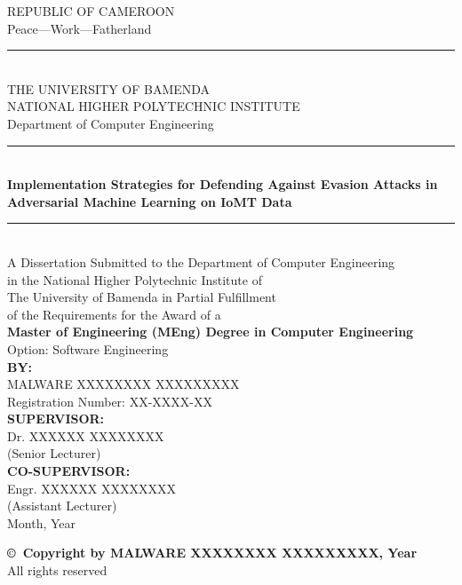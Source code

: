 \documentclass[12pt,a4paper,oneside]{report}
\begin{document}
\thispagestyle{empty}
\begin{center}
    \vspace*{0.5cm}
    {\large REPUBLIC OF CAMEROON}\\[0.2cm]
    {\large Peace---Work---Fatherland}\\[0.5cm]
    \rule{\textwidth}{0.5pt}\\[0.3cm]
    {\Large THE UNIVERSITY OF BAMENDA}\\[0.2cm]
    {\Large NATIONAL HIGHER POLYTECHNIC INSTITUTE}\\[0.2cm]
    {\large Department of Computer Engineering}\\[1.5cm]
    \rule{\textwidth}{0.5pt}\\[0.8cm]
    {\Huge\bfseries Implementation Strategies for Defending Against Evasion Attacks in Adversarial Machine Learning on IoMT Data}\\[1.0cm]
    \rule{\textwidth}{0.5pt}\\[1.0cm]
    {\large A Dissertation Submitted to the Department of Computer Engineering}\\
    {\large in the National Higher Polytechnic Institute of}\\
    {\large The University of Bamenda in Partial Fulfillment}\\
    {\large of the Requirements for the Award of a}\\[0.3cm]
    {\Large\bfseries Master of Engineering (MEng) Degree in Computer Engineering}\\[1.0cm]
    {\large Option: Software Engineering}\\[1.5cm]
    {\large\bfseries BY:}\\[0.3cm]
    {\Large MALWARE XXXXXXXX XXXXXXXXX}\\[0.2cm]
    {\large Registration Number: XX-XXXX-XX}\\[1.5cm]
    {\large\bfseries SUPERVISOR:}\\[0.3cm]
    {\large Dr. XXXXXX XXXXXXXX}\\[0.2cm]
    {\large (Senior Lecturer)}\\[0.5cm]
    {\large\bfseries CO-SUPERVISOR:}\\[0.3cm]
    {\large Engr. XXXXXX XXXXXXXX}\\[0.2cm]
    {\large (Assistant Lecturer)}\\[1.5cm]
    {\large Month, Year}
    \vfill
\end{center}
\newpage

\thispagestyle{empty}
\begin{center}
    \vspace*{4cm}
    {\large\bfseries \copyright~Copyright by MALWARE XXXXXXXX XXXXXXXXX, Year}\\[0.5cm]
    {\large All rights reserved}
    \vfill
\end{center}
\newpage
\end{document}
